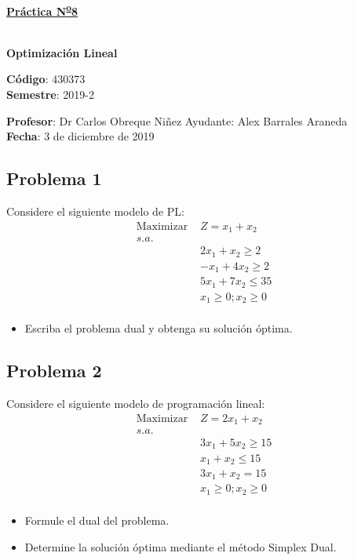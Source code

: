 \documentclass[letterpaper]{article}
\begin{document}
\vspace*{0.5\baselineskip}
\begin{center}
\begin{Large}
\textbf{\underline{Práctica N\textsuperscript{\underline{o}}8}}
\end{Large}\\
\vspace*{0.5\baselineskip}
\textbf{Optimización Lineal} \\
\vspace*{0.5\baselineskip}
\begin{footnotesize}
\textbf{Código}: 430373\\
\textbf{Semestre}: 2019-2
\end{footnotesize}
\end{center}

\noindent \textbf{Profesor}: Dr Carlos Obreque Niñez  \hfill Ayudante: Alex Barrales Araneda\\
\noindent \textbf{Fecha}: 3 de diciembre de 2019

\subsection*{Problema 1}
Considere el siguiente modelo de PL:
\begin{align*}
\mbox{Maximizar }&Z = x_1 + x_2\\
s.a.\\
&2x_1 + x_2 \geq 2\\
&-x_1 + 4x_2 \geq 2\\
&5x_1 + 7x_2 \leq 35\\
&x_1 \geq 0 ; x_2 \geq 0\\
\end{align*}

\begin{itemize}
\item Escriba el problema dual y obtenga su solución óptima.
\end{itemize}
\subsection*{Problema 2}
Considere el siguiente modelo de programación lineal:
\begin{align*}
\mbox{Maximizar }&Z = 2x_1 + x_2 \\
s.a.\\
&3x_1 + 5x_2 \geq 15\\
&x_1 + x_2 \leq 15\\
&3x_1 + x_2  = 15\\
&x_1 \geq 0 ;x_2 \geq 0\\
\end{align*}

\begin{itemize}
\item Formule el dual del problema.
\item Determine la solución óptima mediante el método Simplex Dual.
\end{itemize}

\newpage


 
\end{document}
